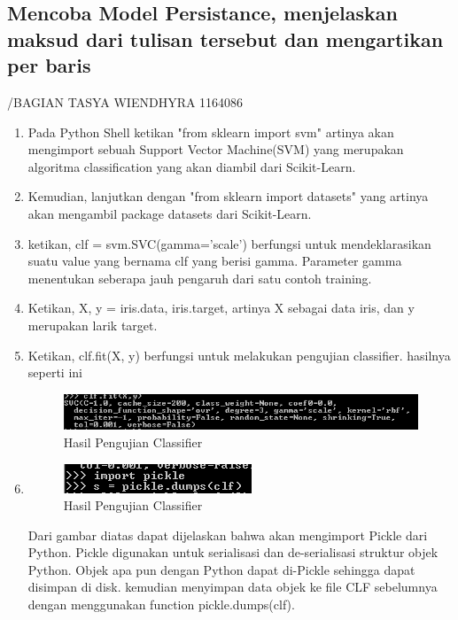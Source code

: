 \subsection{Mencoba Model Persistance, menjelaskan maksud dari tulisan tersebut dan mengartikan per baris} /BAGIAN TASYA WIENDHYRA 1164086
\begin{enumerate}
\item
Pada Python Shell ketikan "from sklearn import svm" artinya akan mengimport sebuah Support Vector Machine(SVM) yang merupakan algoritma classification yang akan diambil dari Scikit-Learn.
\item
Kemudian, lanjutkan dengan "from sklearn import datasets" yang artinya akan mengambil package datasets dari Scikit-Learn.
\item
ketikan, clf = svm.SVC(gamma='scale') berfungsi untuk mendeklarasikan suatu value yang bernama clf yang berisi gamma. Parameter gamma menentukan seberapa jauh pengaruh dari satu contoh training.
\item
Ketikan, X, y = iris.data, iris.target, artinya X sebagai data iris, dan y merupakan larik target.
\item
Ketikan, clf.fit(X, y) berfungsi untuk melakukan pengujian classifier. hasilnya seperti ini
\begin{figure}
	\begin{center}
   	 \includegraphics[scale=1]{figures/tasya7.png}
   	 \caption{Hasil Pengujian Classifier}	
	\end{center}
\end{figure}
\item
\begin{figure}
	\begin{center}
   	 \includegraphics[scale=1]{figures/tasya8.png}
   	 \caption{Hasil Pengujian Classifier}	
	\end{center}
\end{figure}
Dari gambar diatas dapat dijelaskan bahwa akan mengimport Pickle dari Python. Pickle digunakan untuk serialisasi dan de-serialisasi struktur objek Python. Objek apa pun dengan Python dapat di-Pickle sehingga dapat disimpan di disk. kemudian menyimpan data objek ke file CLF sebelumnya dengan menggunakan function pickle.dumps(clf).

\end{enumerate}
